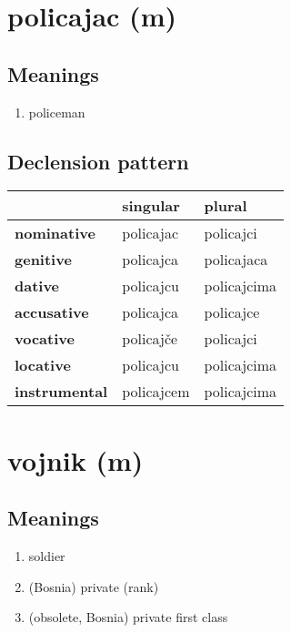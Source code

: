 \filbreak
\section{policajac (m)}
\subsection*{Meanings}
\begin{enumerate}
\item policeman
\end{enumerate}
\subsection*{Declension pattern}
\begin{tabularx}{\linewidth}{Xll}
\toprule
{} &    singular &       plural \\
\midrule
\textbf{nominative  } &   policajac &    policajci \\
\textbf{genitive    } &   policajca &   policajaca \\
\textbf{dative      } &   policajcu &  policajcima \\
\textbf{accusative  } &   policajca &    policajce \\
\textbf{vocative    } &   policajče &    policajci \\
\textbf{locative    } &   policajcu &  policajcima \\
\textbf{instrumental} &  policajcem &  policajcima \\
\bottomrule
\end{tabularx}

\filbreak
\section{vojnik (m)}
\subsection*{Meanings}
\begin{enumerate}
\item soldier
\item (Bosnia) private (rank)
\item (obsolete, Bosnia) private first class
\end{enumerate}
